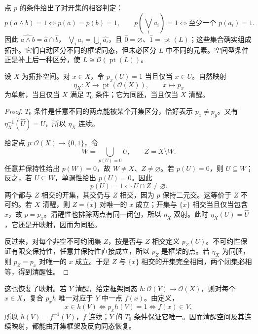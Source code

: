 点 \(p\) 的条件给出了对开集的相容判定：
\[
	p(a\wedge b)=1\iff p(a)=p(b)=1,\qquad p\!\left(\bigvee_i a_i\right)=1\iff \text{至少一个 }p(a_i)=1.
\]
因此 \(\widehat{a\wedge b}=\widehat a\cap\widehat b\)， \(\widehat{\bigvee_i a_i}=\bigcup_i\widehat{a_i}\)，且 \(\widehat 0=\varnothing\)、\(\widehat 1=\operatorname{pt}(L)\)；这些集合确实组成拓扑。它们自动区分不同的框架同态，但未必区分 \(L\) 中不同的元素。空间型条件正是补上后一种区分，使 \(L\cong\mathcal O(\operatorname{pt}(L))\)。

\begin{proposition}\label{b4:prop:sober-space-recovery}
	设 \(X\) 为拓扑空间。对 \(x\in X\)，令 \(p_x(U)=1\) 当且仅当 \(x\in U\)。自然映射
	\[
		\eta_X:X\longrightarrow\operatorname{pt}(\mathcal O(X)), \qquad x\longmapsto p_x
	\]
	为单射，当且仅当 \(X\) 满足 \(T_0\) 条件；它为同胚，当且仅当 \(X\) 清醒。
\end{proposition}
\begin{proof}
	\(T_0\) 条件是任意不同的两点能被某个开集区分，恰好表示 \(p_x\ne p_y\)。又有 \(\eta_X^{-1}(\widehat U)=U\)，所以 \(\eta_X\) 连续。

	给定点 \(p:\mathcal O(X)\to\{0,1\}\)，令
	\[
		W=\bigcup_{p(U)=0}U,\qquad Z=X\setminus W.
	\]
	任意并保持性给出 \(p(W)=0\)，故 \(W\ne X\)、\(Z\ne\varnothing\)。若 \(p(U)=0\)，则 \(U\subseteq W\)；反之，若 \(U\subseteq W\)，单调性给出 \(p(U)=0\)。因此
	\[
		p(U)=1\iff U\cap Z\ne\varnothing.
	\]
	两个都与 \(Z\) 相交的开集，其交仍与 \(Z\) 相交，因为 \(p\) 保持二元交。这等价于 \(Z\) 不可约。若 \(X\) 清醒，则 \(Z=\overline{\{x\}}\) 对唯一的 \(x\) 成立；开集与 \(\overline{\{x\}}\) 相交当且仅当包含 \(x\)，故 \(p=p_x\)。清醒性也排除两点有同一闭包，所以 \(\eta_X\) 双射。此时 \(\eta_X(U)=\widehat U\)，它还是开映射，因而为同胚。

	反过来，对每个非空不可约闭集 \(Z\)，按是否与 \(Z\) 相交定义 \(p_Z(U)\)。不可约性保证有限交保持性，任意并保持性直接成立，所以 \(p_Z\) 是框架的点。若 \(\eta_X\) 为同胚，则 \(p_Z=p_x\) 对唯一的 \(x\) 成立。于是 \(Z\) 与 \(\overline{\{x\}}\) 相交的开集完全相同，两个闭集必相等，得到清醒性。
\end{proof}

这也恢复了映射。若 \(Y\) 清醒，给定框架同态 \(h:\mathcal O(Y)\to\mathcal O(X)\)，则对每个 \(x\in X\)，复合 \(p_xh\) 唯一对应于 \(Y\) 中一点 \(f(x)\)。由定义，
\[
	x\in h(V)\iff p_xh(V)=1\iff f(x)\in V,
\]
所以 \(h(V)=f^{-1}(V)\)，\(f\) 连续；\(Y\) 的 \(T_0\) 条件保证它唯一。因而清醒空间及其连续映射，都能由开集框架及反向同态恢复。

